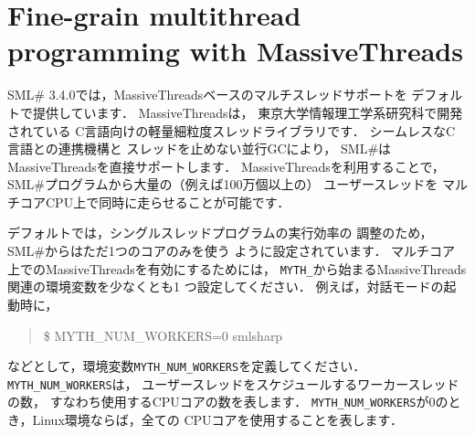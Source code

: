 \documentclass{jbook}
\newcommand{\txt}[2]{#2}
\newcommand{\smlsharp}{SML\#}
\newenvironment{program}{\begin{quote}\begin{tt}}%
                        {\end{tt}\end{quote}}
\begin{document}
\section{\txt{MassiveThreadsを用いた細粒度スレッドプログラミング}
{Fine-grain multithread programming with MassiveThreads}}

\ifjp%
	\smlsharp{} 3.4.0では，MassiveThreadsベースのマルチスレッドサポートを
デフォルトで提供しています．
	MassiveThreadsは，
東京大学情報理工学系研究科で開発されている
C言語向けの軽量細粒度スレッドライブラリです．
	シームレスなC言語との連携機構と
スレッドを止めない並行GCにより，
\smlsharp{}はMassiveThreadsを直接サポートします．
	MassiveThreadsを利用することで，
\smlsharp{}プログラムから大量の（例えば100万個以上の）
ユーザースレッドを
マルチコアCPU上で同時に走らせることが可能です．

	デフォルトでは，シングルスレッドプログラムの実行効率の
調整のため，\smlsharp{}からはただ1つのコアのみを使う
ように設定されています．
	マルチコア上でのMassiveThreadsを有効にするためには，
\verb|MYTH_|から始まるMassiveThreads関連の環境変数を少なくとも1
つ設定してください．
	例えば，対話モードの起動時に，
\begin{program}
\$ MYTH\_NUM\_WORKERS=0 smlsharp
\end{program}
などとして，環境変数\verb|MYTH_NUM_WORKERS|を定義してください．
	\verb|MYTH_NUM_WORKERS|は，
ユーザースレッドをスケジュールするワーカースレッドの数，
すなわち使用するCPUコアの数を表します．
	\verb|MYTH_NUM_WORKERS|が0のとき，Linux環境ならば，全ての
CPUコアを使用することを表します．
\end{document}
